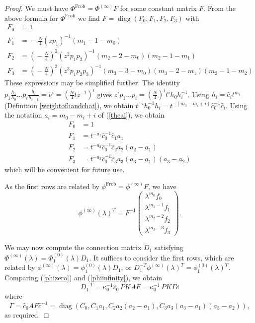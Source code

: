 \documentclass[a4paper,12pt,leqno]{amsart}
\numberwithin{equation}{section}
\theoremstyle{plain}
\theoremstyle{definition}
\newcommand{\la}{\lambda}
\newcommand{\Ga}{\Gamma}
\newcommand{\ka}{\kappa}
\DeclareMathOperator{\diag}{diag}
\newcommand{\no}{\noindent}
\newcommand{\bp}{\begin{pmatrix}}
\newcommand{\ep}{\end{pmatrix}}
\newcommand{\Phiz}{\Phi^{(0)}}
\newcommand{\Phii}{\Phi^{(\infty)}}
\newcommand{\phiz}{\phi^{(0)}}
\newcommand{\phii}{\phi^{(\infty)}}
\newcommand{\nn}{m}
\newcommand{\Asharp}{\Ga}
\begin{document}
\begin{proof}
We must have $\Phi^{\text {Frob}} = \Phii F$ 
for some constant matrix $F$.   From the above formula for $\Phi^{\text {Frob}}$ we find
$F=\diag(F_0,F_1,F_2,F_3)$ with
\begin{align*}
F_0&=1
\\
F_1&=\!-\tfrac{N}{4}(zp_1)^{-1}(\nn_1\!\!-\!\!1\!\!-\!\!\nn_0)
\\
F_2&=\left(\!-\tfrac{N}{4}\right)^2(z^2p_1p_2)^{-1}(\nn_2\!\!-\!\!2\!\!-\!\!\nn_0)(\nn_2\!\!-\!\!1\!\!-\!\!\nn_1)
\\
F_3&=
\left(\!-\tfrac{N}{4}\right)^3(z^3p_1p_2p_3)^{-1}(\nn_3\!\!-\!\!3\!\!-\!\!\nn_0)(\nn_3\!\!-\!\!2\!\!-\!\!\nn_1)(\nn_3\!\!-\!\!1\!\!-\!\!\nn_2)
\end{align*}
These expressions may be simplified further.  The identity 
$p_1\tfrac{h_1}{h_0}\dots p_i\tfrac{h_i}{h_{i-1}}=\nu^i=\left( \tfrac N4 t z^{-1}\right)^i$
gives $z^ip_1\dots p_i=\left(\tfrac{N}{4}\right)^i t^i h_0h_i^{-1}$.  
Using $h_i=\hat c_i t^{\nn_i}$ (Definition \ref{weightofhandchat}),
we obtain
$t^{-i} h_0^{-1}h_i = t^{-(\nn_0-\nn_i+i)}\hat c_0^{-1} \hat c_i$.  
Using the notation $a_i=\nn_0-\nn_i+i$ of (\ref{theai}),
we obtain
\begin{align*}
F_0&=1
\\
F_1&=t^{-a_1}\hat c_0^{-1}\hat c_1 a_1
\\
F_2&=t^{-a_2}\hat c_0^{-1}\hat c_2 a_2(a_2-a_1)
\\
F_3&=t^{-a_3}\hat c_0^{-1}\hat c_3 a_3(a_3-a_1)(a_3- a_2)
\end{align*}
which will be convenient for future use.

As the first rows are related by $\phi^{\text {Frob}}=\phii F$, we have
\begin{equation}\label{phiinfinity}
\phii(\la)^T =
F^{-1}\bp
\la^{\nn_0}f_0 \\ \la^{\nn_1-1}f_1 \\ \la^{\nn_2-2}f_2 \\\la^{\nn_3-3}f_3
\ep.
\end{equation}

\no{\em (iii) The computation of $D_1$.}  
We may now compute the connection matrix $D_1$ satisfying $\Phii(\la)=\Phiz_1(\la) D_1$.    It suffices to consider the first rows, which are related by $\phii(\la)=\phiz_1(\la) D_1$, or $D_1^{-T} {\phii}(\la)^T = {\phiz_1}(\la)^T$. 
Comparing (\ref{phizero}) and (\ref{phiinfinity}), we obtain
\[
D_1^{-T} 
=
\ka_0^{-1}\hat c_0  \, P K A F 
= 
\ka_0^{-1}  \, P K \Asharp \hat c
\]
where 
\[
\Asharp=\hat c_0 A F \hat c^{-1}
=
\diag(C_0,C_1 a_1,C_2 a_2 (a_2\!-\!a_1),C_3 a_3 (a_3\!-\!a_1) (a_3\!-\!a_2)),
\]
as required.
\end{proof}
\end{document}
